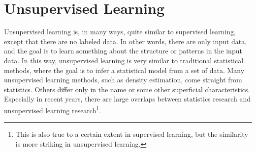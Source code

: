 \section{Unsupervised Learning}
\label{sec:unsupervised-learning}
Unsupervised learning is, in many ways, quite similar to supervised learning, except that there are no labeled data. In other words, there are only input data, and the goal is to learn something about the structure or patterns in the input data. In this way, unsupervised learning is very similar to traditional statistical methods, where the goal is to infer a statistical model from a set of data. Many unsupervised learning methods, such as density estimation, come straight from statistics. Others differ only in the name or some other superficial characteristics. Especially in recent years, there are large overlaps between statistics research and unsupervised learning research\footnote{This is also true to a certain extent in supervised learning, but the similarity is more striking in unsupervised learning.}.

